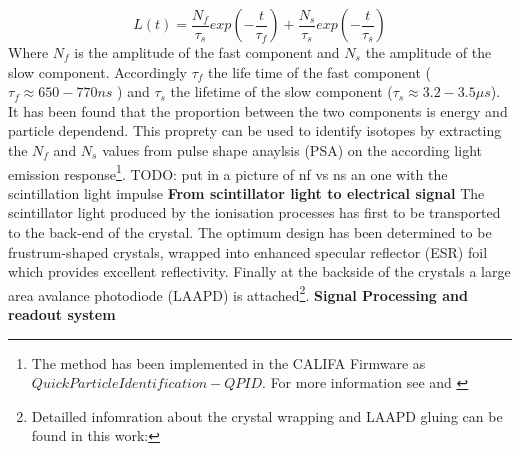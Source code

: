\begin{equation}
L(t) = \frac{N_f}{\tau_s} exp(-\frac{t}{\tau_f}) + \frac{N_s}{\tau_s} exp(-\frac{t}{\tau_s})
\end{equation}
Where $N_{f}$ is the amplitude of the fast component and $N_{s}$ the amplitude of the slow component. Accordingly $\tau_{f}$ the life time of the fast component ($\tau_{f} \approx 650-770 ns$ ) and $\tau_{s}$ the lifetime of the slow component ($\tau_{s} \approx 3.2 - 3.5\mu s$). It has been found that the proportion between the two components is energy and particle dependend. This proprety can be used to identify isotopes by extracting the $N_{f}$ and $N_{s}$ values from pulse shape anaylsis (PSA) on the according light emission response\footnote{The method has been implemented in the CALIFA Firmware as $Quick Particle Identification -QPID$. For more information see \cite{winkel2011implementierung} and \cite{winkel2016komplexe}}.  
TODO: put in a picture of nf vs ns an one with the scintillation light impulse
\textbf{From scintillator light to electrical signal}\newline
The scintillator light produced by the ionisation processes  has first to be transported to the back-end of the crystal. The optimum design has been determined to be frustrum-shaped crystals, wrapped into enhanced specular reflector (ESR) foil which provides excellent reflectivity. Finally at the backside of the crystals a large area avalance photodiode (LAAPD) is attached\footnote{Detailled infomration about the crystal wrapping and LAAPD gluing can be found in this work:\cite{hartigevolution}}.  
\textbf{Signal Processing and readout system}\newline
